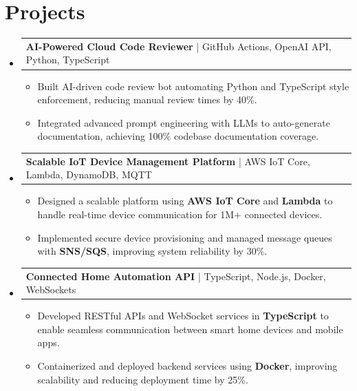 \documentclass[letterpaper,11pt]{article}
\makeatletter
\newcommand{\resumeItem}[1]{
  \item\footnotesize{
    {#1 \vspace{-2pt}}
  }
}
\newcommand{\resumeProjectHeading}[2]{
    \item
    \begin{tabular*}{1.001\textwidth}{l@{\extracolsep{\fill}}r}
      \small#1 & \textbf{\small #2}\\
    \end{tabular*}\vspace{-7pt}
}
\newcommand{\resumeSubHeadingListStart}{\begin{itemize}[leftmargin=0pt, label={}]}
\newcommand{\resumeSubHeadingListEnd}{\end{itemize}}
\newcommand{\resumeItemListStart}{\begin{itemize}[leftmargin=*]}
\newcommand{\resumeItemListEnd}{\end{itemize}\vspace{-5pt}}
\makeatother
\begin{document}
\section{Projects}
    \vspace{-5pt}
    \resumeSubHeadingListStart
          \resumeProjectHeading
              {\textbf{AI-Powered Cloud Code Reviewer} | GitHub Actions, OpenAI API, Python, TypeScript}{}
        \resumeItemListStart
            \resumeItem{Built AI-driven code review bot automating Python and TypeScript style enforcement, reducing manual review times by 40\%.}
            \resumeItem{Integrated advanced prompt engineering with LLMs to auto-generate documentation, achieving 100\% codebase documentation coverage.}
        \resumeItemListEnd
        \vspace{-12pt}
    
    \resumeProjectHeading
        {\textbf{Scalable IoT Device Management Platform} | AWS IoT Core, Lambda, DynamoDB, MQTT}{}
        \resumeItemListStart
            \resumeItem{Designed a scalable platform using \textbf{AWS IoT Core} and \textbf{Lambda} to handle real-time device communication for 1M+ connected devices.}
            \resumeItem{Implemented secure device provisioning and managed message queues with \textbf{SNS/SQS}, improving system reliability by 30\%.}
        \resumeItemListEnd
          \vspace{-12pt}
      \resumeProjectHeading
          {\textbf{Connected Home Automation API} | TypeScript, Node.js, Docker, WebSockets}{}
          \resumeItemListStart
              \resumeItem{Developed RESTful APIs and WebSocket services in \textbf{TypeScript} to enable seamless communication between smart home devices and mobile apps.}
              \resumeItem{Containerized and deployed backend services using \textbf{Docker}, improving scalability and reducing deployment time by 25\%.}
          \resumeItemListEnd 
    \resumeSubHeadingListEnd
\end{document}
